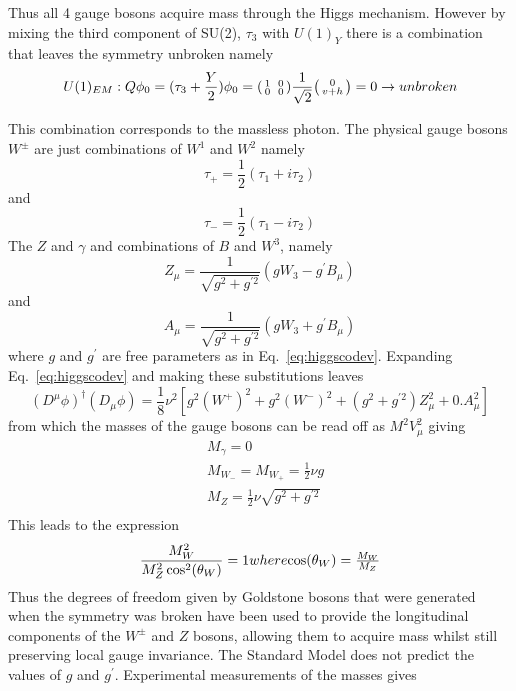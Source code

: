 Thus all 4 gauge bosons acquire mass through the Higgs mechanism. However by mixing the third component of SU(2), $\tau_{3}$ with $U(1)_{Y}$ there is a combination  that leaves the symmetry unbroken namely
\begin{equation}
  U(1)_{EM}: Q\phi_{0} = (\tau_{3} + \frac{Y}{2})\phi_{0} = \begin{psmallmatrix}1&&0\\0&&0\end{psmallmatrix}\frac{1}{\sqrt{2}} \begin{psmallmatrix}0\\v+h\end{psmallmatrix}= 0 \to unbroken\\
\end{equation}

This combination corresponds to the massless photon. The physical gauge bosons $W^{\pm}$ are just combinations of $W^{1}$ and $W^{2}$ namely
\begin{equation}
  \tau_{+} = \frac{1}{2}(\tau_{1}+i\tau_{2})
\end{equation}
and
\begin{equation}
  \tau_{-} = \frac{1}{2}(\tau_{1}-i\tau_{2})
\end{equation}
The $Z$ and $\gamma$ and combinations of $B$ and $W^{3}$, namely
\begin{equation}
  Z_{\mu} = \frac{1}{\sqrt{g^{2}+g^{\prime 2}}} (gW_{3} - g^{\prime}B_{\mu})
\end{equation}
 and
 \begin{equation}
  A_{\mu} = \frac{1}{\sqrt{g^{2}+g^{\prime 2}}} (gW_{3} + g^{\prime}B_{\mu})
\end{equation}
 where $g$ and $g^{\prime}$ are free parameters as in Eq.~\ref{eq:higgscodev}. Expanding Eq.~\ref{eq:higgscodev} and making these substitutions leaves
\begin{equation}
  (D^{\mu}\phi)^\dagger(D_{\mu}\phi) = \frac{1}{8}\nu^{2}[g^{2}(W^{+})^{2} + g^{2}(W^{-})^{2} + (g^{2}+g^{\prime 2})Z_{\mu}^{2} + 0.A_{\mu}^{2}] 
  \end{equation}
from which the masses of the gauge bosons can be read off as $M^{2}V_{\mu}^{2}$ giving
\begin{equation}
  \begin{split}
    &M_{\gamma} = 0\\
    &M_{W_{-}} = M_{W_{+}} = \frac{1}{2}\nu g\\
    &M_{Z} =  \frac{1}{2}\nu\sqrt{g^{2}+g^{\prime 2}} \\
  \end{split}
\end{equation}
This leads to the expression
\begin{equation}
  \frac{M_{W}^{2}}{M_{Z}^{2}\cos^{2}(\theta_{W})}  = 1 $$where$$
  \cos(\theta_{W}) =  \frac{M_{W}}{M_{Z}}
\end{equation}
Thus the degrees of freedom given by Goldstone bosons that were generated when the symmetry was broken have been used to provide the longitudinal components of the $W^{\pm}$ and $Z$ bosons, allowing them to acquire mass whilst still preserving local gauge invariance. The Standard Model does not predict the values of $g$ and $g^{\prime}$. Experimental measurements of the masses gives

